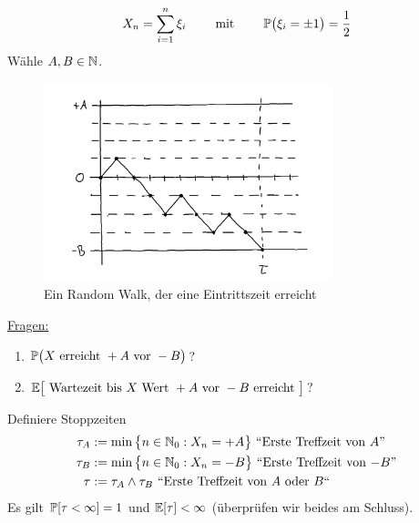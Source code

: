 \begin{beisp}
\begin{align*}
X_n=\sum\limits_{i=1}^n \xi_i\qquad\mit\qquad \P\big(\xi_i=\pm 1\big)=\frac{1}{2}
\end{align*}
Wähle $A,B\in\N$.
\begin{figure}[h!]
	\center
	\includegraphics[width=0.75\textwidth]{./pics/Sketch0.png}
	\caption{Ein Random Walk, der eine Eintrittszeit erreicht}
	\label{AbbEintrittszeit}
\end{figure}
\enter
\underline{Fragen:} 
\begin{enumerate}
\item $\P\big( X\text{ erreicht }+A\text{ vor }-B\big)$?
\item $\E\big[\text{ Wartezeit bis }X\text{ Wert }+A\text{ vor }-B\text{ erreicht }\big]$?
\end{enumerate}
Definiere Stoppzeiten 
\begin{align*}
\tau_A&:=\min\big\lbrace n\in\N_0:X_n=+A\big\rbrace\text{ ``Erste Treffzeit von $A$''}\\
\tau_B&:=\min\big\lbrace n\in\N_0:X_n=-B\big\rbrace\text{ ``Erste Treffzeit von $-B$''}\\
\tau&:=\tau_A\wedge\tau_B\text{ ``Erste Treffzeit von $A$ oder $B$``}
\end{align*}
Es gilt $\P[\tau<\infty]=1$  und $\E[\tau]<\infty$ (überprüfen wir beides am Schluss).\\


\end{beisp}
